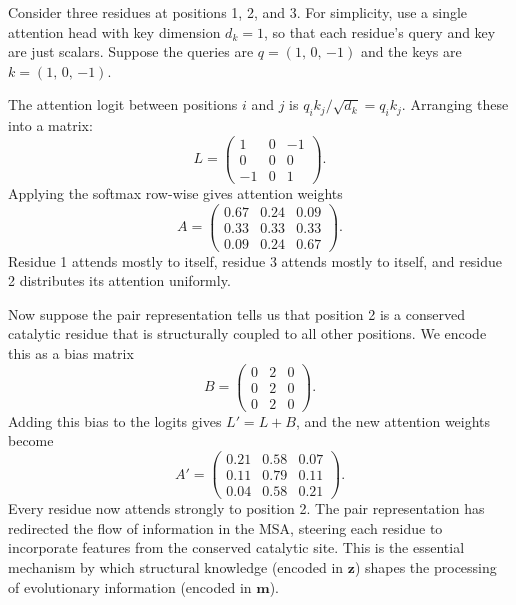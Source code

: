 Consider three residues at positions 1, 2, and 3.
For simplicity, use a single attention head with key dimension $d_k = 1$, so that each residue's query and key are just scalars.
Suppose the queries are $q = (1,\, 0,\, {-1})$ and the keys are $k = (1,\, 0,\, {-1})$.

The attention logit between positions $i$ and $j$ is $q_i k_j / \sqrt{d_k} = q_i k_j$.
Arranging these into a matrix:
\begin{equation}
\label{eq:logit-example}
L = \begin{pmatrix} 1 & 0 & -1 \\ 0 & 0 & 0 \\ -1 & 0 & 1 \end{pmatrix}.
\end{equation}
Applying the softmax row-wise gives attention weights
\begin{equation}
\label{eq:attn-example-nobias}
A = \begin{pmatrix} 0.67 & 0.24 & 0.09 \\ 0.33 & 0.33 & 0.33 \\ 0.09 & 0.24 & 0.67 \end{pmatrix}.
\end{equation}
Residue 1 attends mostly to itself, residue 3 attends mostly to itself, and residue 2 distributes its attention uniformly.

Now suppose the pair representation tells us that position 2 is a conserved catalytic residue that is structurally coupled to all other positions.
We encode this as a bias matrix
\begin{equation}
\label{eq:pair-bias-example}
B = \begin{pmatrix} 0 & 2 & 0 \\ 0 & 2 & 0 \\ 0 & 2 & 0 \end{pmatrix}.
\end{equation}
Adding this bias to the logits gives $L' = L + B$, and the new attention weights become
\begin{equation}
\label{eq:attn-example-bias}
A' = \begin{pmatrix} 0.21 & 0.58 & 0.07 \\ 0.11 & 0.79 & 0.11 \\ 0.04 & 0.58 & 0.21 \end{pmatrix}.
\end{equation}
Every residue now attends strongly to position 2.
The pair representation has redirected the flow of information in the MSA, steering each residue to incorporate features from the conserved catalytic site.
This is the essential mechanism by which structural knowledge (encoded in $\bm{z}$) shapes the processing of evolutionary information (encoded in $\bm{m}$).

